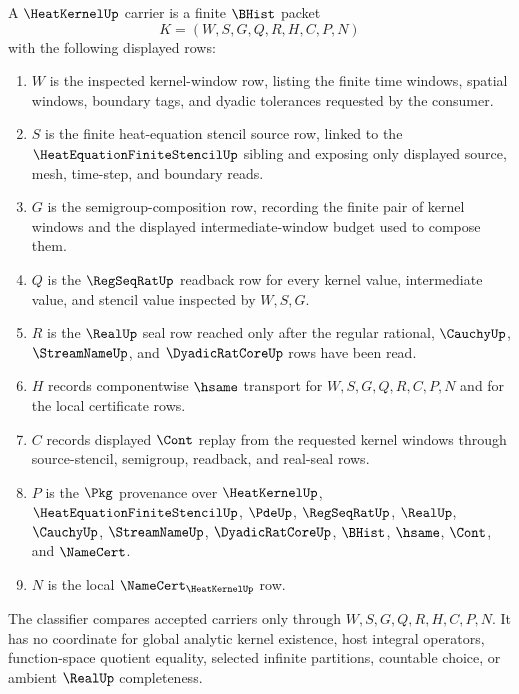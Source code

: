 \begin{definition}
\label{def:heat-kernel-carrier}
A $\HeatKernelUp$ carrier is a finite $\BHist$ packet
$$
K=(W,S,G,Q,R,H,C,P,N)
$$
with the following displayed rows:
\begin{enumerate}
\item $W$ is the inspected kernel-window row, listing the finite time windows,
spatial windows, boundary tags, and dyadic tolerances requested by the
consumer.
\item $S$ is the finite heat-equation stencil source row, linked to the
$\HeatEquationFiniteStencilUp$ sibling and exposing only displayed source,
mesh, time-step, and boundary reads.
\item $G$ is the semigroup-composition row, recording the finite pair of
kernel windows and the displayed intermediate-window budget used to compose
them.
\item $Q$ is the $\RegSeqRatUp$ readback row for every kernel value,
intermediate value, and stencil value inspected by $W,S,G$.
\item $R$ is the $\RealUp$ seal row reached only after the regular rational,
$\CauchyUp$, $\StreamNameUp$, and $\DyadicRatCoreUp$ rows have been read.
\item $H$ records componentwise $\hsame$ transport for $W,S,G,Q,R,C,P,N$ and
for the local certificate rows.
\item $C$ records displayed $\Cont$ replay from the requested kernel windows
through source-stencil, semigroup, readback, and real-seal rows.
\item $P$ is the $\Pkg$ provenance over $\HeatKernelUp$,
$\HeatEquationFiniteStencilUp$, $\PdeUp$, $\RegSeqRatUp$, $\RealUp$,
$\CauchyUp$, $\StreamNameUp$, $\DyadicRatCoreUp$, $\BHist$, $\hsame$, $\Cont$,
and $\NameCert$.
\item $N$ is the local $\NameCert_{\HeatKernelUp}$ row.
\end{enumerate}
The classifier compares accepted carriers only through $W,S,G,Q,R,H,C,P,N$.
It has no coordinate for global analytic kernel existence, host integral
operators, function-space quotient equality, selected infinite partitions,
countable choice, or ambient $\RealUp$ completeness.
\end{definition}

